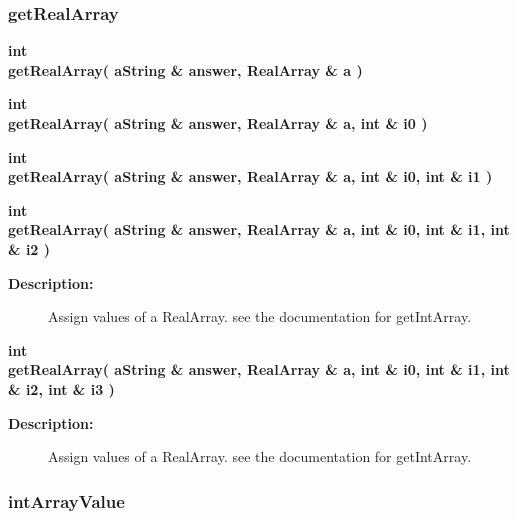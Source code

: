 \subsubsection{getRealArray}
 
\begin{flushleft} \textbf{%
int  \\ 
\settowidth{\NameListIncludeArgIndent}{getRealArray(}%
getRealArray( aString \& answer, RealArray \& a )
}\end{flushleft}

 
\begin{flushleft} \textbf{%
int  \\ 
\settowidth{\NameListIncludeArgIndent}{getRealArray(}%
getRealArray( aString \& answer, RealArray \& a, int \& i0 )
}\end{flushleft}

 
\begin{flushleft} \textbf{%
int  \\ 
\settowidth{\NameListIncludeArgIndent}{getRealArray(}%
getRealArray( aString \& answer, RealArray \& a, int \& i0, int \& i1 )
}\end{flushleft}

 
\begin{flushleft} \textbf{%
int  \\ 
\settowidth{\NameListIncludeArgIndent}{getRealArray(}%
getRealArray( aString \& answer, RealArray \& a, int \& i0, int \& i1, int \& i2 )
}\end{flushleft}
\begin{description}
\item[{\bf Description:}]  Assign values of a RealArray. see the documentation for
  getIntArray.
\end{description}

 
\begin{flushleft} \textbf{%
int  \\ 
\settowidth{\NameListIncludeArgIndent}{getRealArray(}%
getRealArray( aString \& answer, RealArray \& a, int \& i0, int \& i1, int \& i2, int \& i3 )
}\end{flushleft}
\begin{description}
\item[{\bf Description:}]  Assign values of a RealArray. see the documentation for
  getIntArray.
\end{description}
\subsubsection{intArrayValue}
 

